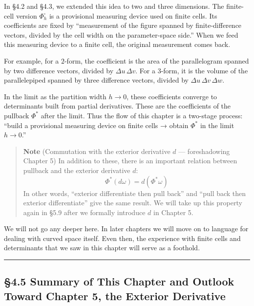 In §4.2 and §4.3, we extended this idea to two and three dimensions. The
finite-cell version \(\Phi_h^\square\) is a provisional measuring device
used on finite cells. Its coefficients are fixed by ``measurement of the
figure spanned by finite-difference vectors, divided by the cell width
on the parameter-space side.'' When we feed this measuring device to a
finite cell, the original measurement comes back.

For example, for a \(2\)-form, the coefficient is the area of the
parallelogram spanned by two difference vectors, divided by
\(\Delta u\,\Delta v\). For a \(3\)-form, it is the volume of the
parallelepiped spanned by three difference vectors, divided by
\(\Delta u\,\Delta v\,\Delta w\).

In the limit as the partition width \(h\to0\), these coefficients
converge to determinants built from partial derivatives. These are the
coefficients of the pullback \(\Phi^*\) after the limit. Thus the flow
of this chapter is a two-stage process: ``build a provisional measuring
device on finite cells → obtain \(\Phi^*\) in the limit \(h\to0\).''

\begin{quote}
\textbf{Note} (Commutation with the exterior derivative \(d\) ---
foreshadowing Chapter 5) In addition to these, there is an important
relation between pullback and the exterior derivative \(d\):
\[\Phi^*(d\omega) = d(\Phi^*\omega)\] In other words, ``exterior
differentiate then pull back'' and ``pull back then exterior
differentiate'' give the same result. We will take up this property
again in §5.9 after we formally introduce \(d\) in Chapter 5.
\end{quote}

We will not go any deeper here. In later chapters we will move on to
language for dealing with curved space itself. Even then, the experience
with finite cells and determinants that we saw in this chapter will
serve as a foothold.

\begin{center}\rule{0.5\linewidth}{0.5pt}\end{center}

\hypertarget{summary-of-this-chapter-and-outlook-toward-chapter-5-the-exterior-derivative}{%
\subsection{§4.5 Summary of This Chapter and Outlook Toward Chapter 5,
the Exterior
Derivative}\label{summary-of-this-chapter-and-outlook-toward-chapter-5-the-exterior-derivative}}

